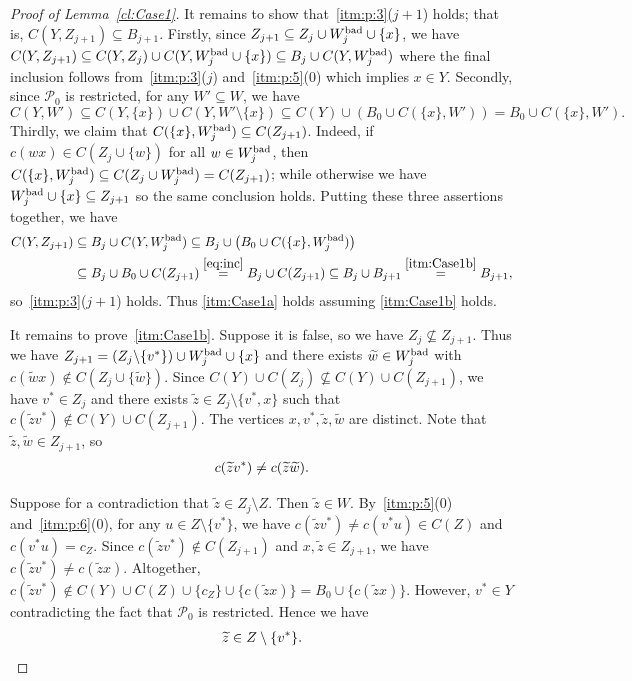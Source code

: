 \documentclass[a4paper, 12pt]{article}
\numberwithin{equation}{section}
\def\sm{{\setminus}}
\def\wt{\widetilde}
\newcommand{\mc}[1]{\mathcal{#1}}
\begin{document}
\begin{proof}[Proof of Lemma~\ref{cl:Case1}]
It remains to show that~\ref{itm:p:3}($j+1$) holds; that is, $C(Y,Z_{j+1}) \subseteq B_{j+1}$.
Firstly, since $Z_{j+1} \subseteq Z_j \cup W^{\rm bad}_j \cup \{x\}$, we have $C(Y,Z_{j+1}) \subseteq C(Y,Z_j) \cup C(Y,W^{\rm bad}_j \cup \{x\}) \subseteq B_j \cup C(Y,W^{\rm bad}_j)$ where the final inclusion follows from~\ref{itm:p:3}($j$) and~\ref{itm:p:5}($0$) which implies $x \in Y$.
Secondly, since $\mc{P}_0$ is restricted, for any $W' \subseteq W$, we have
$$
C(Y,W') \subseteq C(Y,\{x\}) \cup C(Y,W'\sm\{x\}) \subseteq C(Y) \cup (B_0 \cup C(\{x\},W')) = B_0 \cup C(\{x\},W').
$$
Thirdly, we claim that $C(\{x\},W^{\rm bad}_j) \subseteq C(Z_{j+1})$.
Indeed, if $c(wx) \in C(Z_j \cup \{w\})$ for all $w \in W^{\rm bad}_j$, then $C(\{x\},W^{\rm bad}_j) \subseteq C(Z_j \cup W^{\rm bad}_j) = C(Z_{j+1})$;
while otherwise we have $W^{\rm bad}_j \cup \{x\} \subseteq Z_{j+1}$ so the same conclusion holds.
Putting these three assertions together, we have
\begin{align*}
 C(Y,Z_{j+1}) & \subseteq B_j \cup C(Y,W^{\rm bad}_j) 
	\subseteq  B_j\cup  \left( B_0 \cup C(\{x\},W^{\rm bad}_j) \right) \\
	& \subseteq B_j \cup  B_0 \cup C(Z_{j+1})
    \stackrel{\eqref{eq:inc}}{=} B_j \cup C(Z_{j+1}) \subseteq B_j \cup B_{j+1} \stackrel{\ref{itm:Case1b}}{=} B_{j+1},
\end{align*}
so~\ref{itm:p:3}($j+1$) holds.
Thus \ref{itm:Case1a} holds assuming \ref{itm:Case1b} holds. 

It remains to prove~\ref{itm:Case1b}.
Suppose it is false, so we have $Z_j \not \subseteq Z_{j+1}$.
Thus we have $Z_{j+1} = ( Z_j \sm \{v^*\} ) \cup W^{\rm bad}_j \cup \{x\}$ and there exists $\wt{w} \in W^{\rm bad}_j$ with $c(\wt{w}x) \notin C(Z_j \cup \{\wt{w}\})$.
Since $C(Y) \cup C(Z_j) \not\subseteq C(Y) \cup C(Z_{j+1})$, we have $v^* \in Z_j$ and there exists $\wt{z} \in Z_{j}\sm\{v^*,x\}$ such that $c(\wt{z}v^*) \notin  C(Y) \cup C(Z_{j+1})$.
The vertices $x,v^*,\wt{z},\wt{w}$ are distinct.
Note that $\wt{z},\wt{w} \in Z_{j+1}$, so
\begin{align}
c(\wt{z}v^*) \ne c(\wt{z}\wt{w}). \label{eqn:c(wt{z}v^*)}
\end{align}

Suppose for a contradiction that $\wt{z} \in Z_j \setminus Z$. Then $\wt{z} \in W$.
By~\ref{itm:p:5}($0$) and~\ref{itm:p:6}($0$), for any $u \in Z\sm\{v^*\}$, we have $c(\wt{z}v^*) \neq c(v^*u) \in C(Z)$ and $c(v^*u)=c_Z$.
Since $c(\wt{z}v^*) \notin C(Z_{j+1})$ and $x,\wt{z} \in Z_{j+1}$, we have $c(\wt{z}v^*) \neq c(\wt{z}x)$.
Altogether, $c(\wt{z}v^*) \notin  C(Y) \cup C(Z) \cup \{c_Z\} \cup \{c(\wt{z}x)\} = B_0 \cup \{c(\wt{z}x)\}$. 
However, $v^* \in Y$ contradicting the fact that $\mc{P}_0$ is restricted.
Hence we have 
\begin{align}
	\wt{z} \in Z \setminus \{v^*\}. \label{eqn:wt{z}}
\end{align} 


\end{proof}
\end{document}
